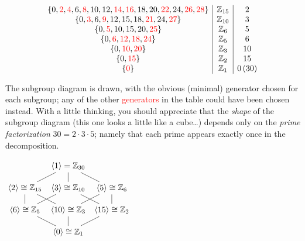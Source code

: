 \begin{example}{}{}
\[\begin{array}[t]{c|c|c}
 \{0,\textcolor{red}{2},\textcolor{red}{4},6,\textcolor{red}{8},10,12,\textcolor{red}{14},\textcolor{red}{16},18,20,\textcolor{red}{22},24,\textcolor{red}{26},\textcolor{red}{28}\} & \mathbb{Z}_{15} & 2\\
\{0,\textcolor{red}{3},6,\textcolor{red}{9},12,15,18,\textcolor{red}{21},24,\textcolor{red}{27}\} & \mathbb{Z}_{10} & 3\\
\{0,\textcolor{red}{5},10,15,20,\textcolor{red}{25}\} & \mathbb{Z}_6 & 5\\
\{0,\textcolor{red}{6},\textcolor{red}{12},\textcolor{red}{18},\textcolor{red}{24}\} & \mathbb{Z}_5 & 6\\
\{0,\textcolor{red}{10},\textcolor{red}{20}\} & \mathbb{Z}_3 & 10\\
\{0,\textcolor{red}{15}\} & \mathbb{Z}_2 & 15\\
\{\textcolor{red}{0}\} & \mathbb{Z}_1 & 0\,(30)
    \end{array}\]
    
	\begin{minipage}[t]{0.6\linewidth}\vspace{0pt}
	The subgroup diagram is drawn, with the obvious (minimal) generator chosen for each subgroup; any of the other \textcolor{red}{generators} in the table could have been chosen instead.\smallbreak
	With a little thinking, you should appreciate that the \emph{shape} of the subgroup diagram (this one looks a little like a cube\ldots) depends only on the \emph{prime factorization} $30=2\cdot 3\cdot 5$; namely that each prime appears exactly once in the decomposition.
	\end{minipage}\begin{minipage}[t]{0.39\linewidth}\vspace{0pt}
	\flushright$\xymatrix @C5pt @R11pt{ & \ip{1}=\Z_{30} \ar@{-}[dl] \ar@{-}[d] \ar@{-}[dr] & \\
\ip{2}\cong \Z_{15} \ar@{-}[d] \ar@{-}[dr] & \ip{3}\cong\Z_{10} \ar@{-}[dl] \ar@{-}[dr] & \ip{5}\cong\Z_6 \ar@{-}[d] \ar@{-}[dl] \\
\ip{6}\cong\Z_5 \ar@{-}[dr] & \ip{10}\cong \Z_{3} \ar@{-}[d] & \ip{15}\cong\Z_2 \ar@{-}[dl] \\
 & \ip{0}\cong\Z_1 &}$
	\end{minipage}
 
\end{example}

\goodbreak

